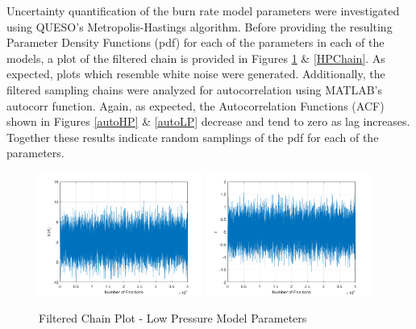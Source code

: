 \documentclass{article}
\begin{document}
Uncertainty quantification of the burn rate model parameters were investigated using QUESO's Metropolis-Hastings
algorithm. Before providing the resulting Parameter Density Functions (pdf) for each of the parameters in each of 
the models, a plot of the filtered chain is provided in Figures \ref{LPChain} \& \ref{HPChain}. As expected, 
plots which resemble white noise were generated. Additionally, the filtered sampling chains were analyzed for
autocorrelation using MATLAB's autocorr function. Again, as expected, the Autocorrelation Functions (ACF) shown in
Figures \ref{autoHP} \& \ref{autoLP} decrease and tend to zero as lag increases. Together these results indicate
random samplings of the pdf for each of the parameters.

\begin{figure}[htb!]
\centering
\includegraphics[width=0.48\textwidth]{FilteredChain_lnA_LP.png}
\includegraphics[width=0.48\textwidth]{FilteredChain_n_LP.png}
\caption{Filtered Chain Plot - Low Pressure Model Parameters}
\label{LPChain}
\end{figure}
\end{document}
